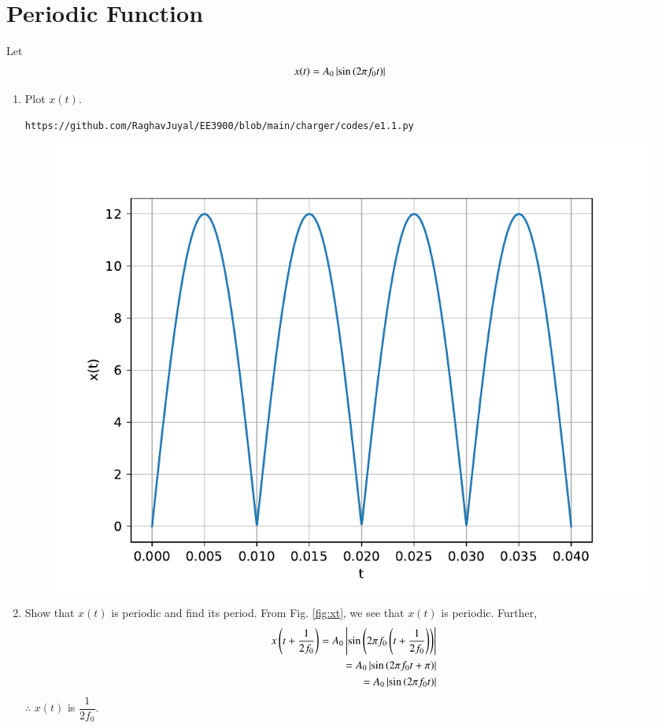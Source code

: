 \documentclass[journal,12pt,twocolumn]{IEEEtran}
\renewcommand\thesection{\arabic{section}}
\begin{document}
\section{Periodic Function}
Let 
\begin{align}
	x(t) &= A_0\left\vert\sin\left(2\pi f_0 t\right)\right\vert
	\label{eq:10-orig-diff-def}
\end{align}
\begin{enumerate}[label=\thesection.\arabic*
,ref=\thesection.\theenumi]
\item Plot $x(t)$.\\
\solution
\begin{lstlisting}
https://github.com/RaghavJuyal/EE3900/blob/main/charger/codes/e1.1.py
\end{lstlisting}
\begin{figure}[!ht]
	\begin{center}
		\includegraphics[width=\columnwidth]{./figs/e1.1.pdf}
	\end{center}
	\label{fig:xt}	
\end{figure}
\item Show that $x(t)$ is periodic and find its period.
\solution From Fig. \eqref{fig:xt}, we see that $x(t)$ is periodic. Further,
\begin{align}
	x\left(t+\frac{1}{2f_0}\right) = A_0\left\vert\sin\left(2\pi f_0\left(t + \frac{1}{2f_0}\right)\right)\right\vert \\
	= A_0\left\vert\sin\left(2\pi f_0t + \pi\right)\right\vert \\
	= A_0\left\vert\sin\left(2\pi f_0t\right)\right\vert
\end{align}
$\therefore$ $x(t)$ is $\dfrac{1}{2f_0}$.

\end{enumerate}
\end{document}
